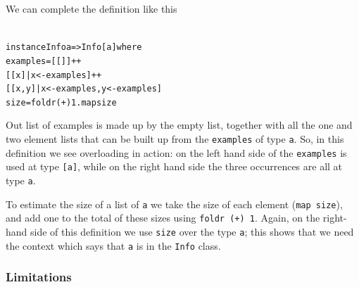 \begin{figure}[t]
\end{figure}

We can complete the
definition like this
\begin{alltt}\label{visiDec}
instance Info a => Info [a] where
  examples = [ [] ] ++ 
             [ [x] | x<-examples ] ++ 
             [ [x,y] | x<-examples , y<-examples ]
  size     = foldr (+) 1 . map size  
\end{alltt}
Out list of examples is made up by the empty list, together with all the one and two element lists that can be built up from the \texttt{examples} of type \texttt{a}. So, in this definition we see overloading in action: on the left hand side of the \texttt{examples} is used at type \texttt{[a]}, while on the right hand side the three occurrences are all at type \texttt{a}.

To estimate the size of a list of \texttt{a} we
take the size of each element (\texttt{map size}), and add one to the total of
these sizes using \texttt{foldr (+) 1}. Again, on the 
right-hand side of this
definition we use \texttt{size} over the type \texttt{a}; this
shows that we need the context which says that \texttt{a} is in the \texttt{Info}
class.

\subsubsection*{Limitations}

